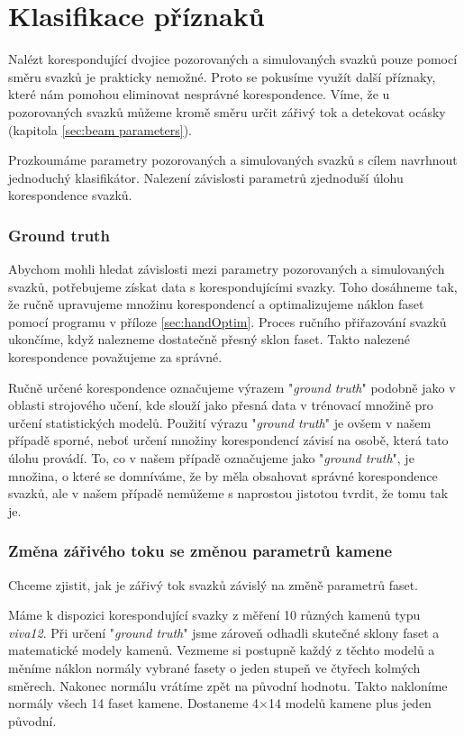 \part{Klasifikace příznaků}

Nalézt korespondující dvojice pozorovaných a simulovaných svazků pouze pomocí směru svazků je prakticky nemožné. Proto se pokusíme využít další příznaky, které nám pomohou eliminovat nesprávné korespondence. Víme, že u pozorovaných svazků můžeme kromě směru určit zářivý tok a detekovat ocásky (kapitola \ref{sec:beam parameters}).   

Prozkoumáme parametry pozorovaných a simulovaných svazků s cílem navrhnout jednoduchý klasifikátor. Nalezení závislosti parametrů zjednoduší úlohu korespondence svazků.  
\vspace{4mm}

\section{Ground truth}

Abychom mohli hledat závislosti mezi parametry pozorovaných a simulovaných svazků, potřebujeme získat data s korespondujícími svazky. Toho dosáhneme tak, že ručně upravujeme množinu korespondencí a optimalizujeme náklon faset pomocí programu v příloze \ref{sec:handOptim}. Proces ručního přiřazování svazků ukončíme, když nalezneme dostatečně přesný sklon faset. Takto nalezené korespondence považujeme za správné.     

Ručně určené korespondence označujeme výrazem "\textit{ground truth}" podobně jako v oblasti strojového učení, kde slouží jako přesná data v trénovací množině pro určení statistických modelů. Použití výrazu "\textit{ground truth}" je ovšem v našem případě sporné, neboť určení množiny korespondencí závisí na osobě, která tato úlohu provádí. To, co v našem případě označujeme jako "\textit{ground truth}", je množina, o které se domníváme, že by měla obsahovat správné korespondence svazků, ale v našem případě nemůžeme s naprostou jistotou tvrdit, že tomu tak je. 

\section{Změna zářivého toku se změnou parametrů kamene}
\label{sec: zmena_tok }

	Chceme zjistit, jak je zářivý tok svazků závislý na změně parametrů faset. 

	Máme k dispozici korespondující svazky z měření 10 různých kamenů typu \textit{viva12}. Při určení "\textit{ground truth}" jsme zároveň odhadli skutečné sklony faset a matematické modely kamenů. Vezmeme si postupně každý z těchto modelů a měníme náklon normály vybrané fasety o jeden stupeň ve čtyřech kolmých směrech. Nakonec normálu vrátíme zpět na původní hodnotu. Takto nakloníme normály všech 14 faset kamene. Dostaneme 4$\times$14 modelů kamene plus jeden původní. 
	
